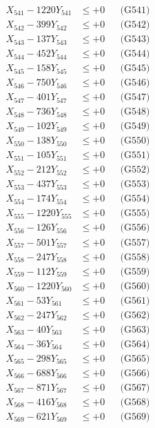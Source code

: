 \documentclass[a4paper,10pt]{article}
\begin{document}
{\begin{align}
\allowbreak
X_{541} - 1220Y_{541} &\leq +0 && \text{(G541)} \\
X_{542} - 399Y_{542} &\leq +0 && \text{(G542)} \\
X_{543} - 137Y_{543} &\leq +0 && \text{(G543)} \\
X_{544} - 452Y_{544} &\leq +0 && \text{(G544)} \\
X_{545} - 158Y_{545} &\leq +0 && \text{(G545)} \\
X_{546} - 750Y_{546} &\leq +0 && \text{(G546)} \\
X_{547} - 401Y_{547} &\leq +0 && \text{(G547)} \\
X_{548} - 736Y_{548} &\leq +0 && \text{(G548)} \\
X_{549} - 102Y_{549} &\leq +0 && \text{(G549)} \\
X_{550} - 138Y_{550} &\leq +0 && \text{(G550)} \\
\allowbreak
X_{551} - 105Y_{551} &\leq +0 && \text{(G551)} \\
X_{552} - 212Y_{552} &\leq +0 && \text{(G552)} \\
X_{553} - 437Y_{553} &\leq +0 && \text{(G553)} \\
X_{554} - 174Y_{554} &\leq +0 && \text{(G554)} \\
X_{555} - 1220Y_{555} &\leq +0 && \text{(G555)} \\
X_{556} - 126Y_{556} &\leq +0 && \text{(G556)} \\
X_{557} - 501Y_{557} &\leq +0 && \text{(G557)} \\
X_{558} - 247Y_{558} &\leq +0 && \text{(G558)} \\
X_{559} - 112Y_{559} &\leq +0 && \text{(G559)} \\
X_{560} - 1220Y_{560} &\leq +0 && \text{(G560)} \\
\allowbreak
X_{561} - 53Y_{561} &\leq +0 && \text{(G561)} \\
X_{562} - 247Y_{562} &\leq +0 && \text{(G562)} \\
X_{563} - 40Y_{563} &\leq +0 && \text{(G563)} \\
X_{564} - 36Y_{564} &\leq +0 && \text{(G564)} \\
X_{565} - 298Y_{565} &\leq +0 && \text{(G565)} \\
X_{566} - 688Y_{566} &\leq +0 && \text{(G566)} \\
X_{567} - 871Y_{567} &\leq +0 && \text{(G567)} \\
X_{568} - 416Y_{568} &\leq +0 && \text{(G568)} \\
X_{569} - 621Y_{569} &\leq +0 && \text{(G569)} \\

\end{align}}
\end{document}
